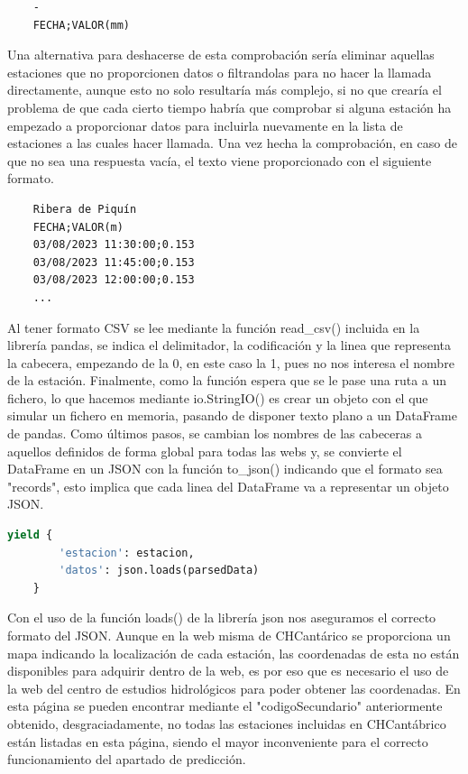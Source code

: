 \begin{verbatim}
	-
	FECHA;VALOR(mm)
\end{verbatim}

Una alternativa para deshacerse de esta comprobación sería eliminar aquellas estaciones que no proporcionen datos o filtrandolas para no hacer la llamada directamente, aunque esto no solo resultaría más complejo, si no que crearía el problema de que cada cierto tiempo habría que comprobar si alguna estación ha empezado a proporcionar datos para incluirla nuevamente en la lista de estaciones a las cuales hacer llamada.\newline
\newline
Una vez hecha la comprobación, en caso de que no sea una respuesta vacía, el texto viene proporcionado con el siguiente formato.

\begin{verbatim}
	Ribera de Piquín
	FECHA;VALOR(m)
	03/08/2023 11:30:00;0.153
	03/08/2023 11:45:00;0.153
	03/08/2023 12:00:00;0.153
	...
\end{verbatim}

Al tener formato CSV se lee mediante la función read\_csv() incluida en la librería pandas, se indica el delimitador, la codificación y la linea que representa la cabecera, empezando de la 0, en este caso la 1, pues no nos interesa el nombre de la estación. Finalmente, como la función espera que se le pase una ruta a un fichero, lo que hacemos mediante io.StringIO() es crear un objeto con el que simular un fichero en memoria, pasando de disponer texto plano a un DataFrame de pandas.\newline
\newline
Como últimos pasos, se cambian los nombres de las cabeceras a aquellos definidos de forma global para todas las webs y, se convierte el DataFrame en un JSON con la función to\_json() indicando que el formato sea "records", esto implica que cada linea del DataFrame va a representar un objeto JSON.

\begin{lstlisting}[language=Python, caption={Guardado de datos de Chcantabrico Nivel Spider}]
	yield {
		'estacion': estacion,
		'datos': json.loads(parsedData)
	}
\end{lstlisting}

Con el uso de la función loads() de la librería json nos aseguramos el correcto formato del JSON.\newline
\newline
Aunque en la web misma de CHCantárico se proporciona un mapa indicando la localización de cada estación, las coordenadas de esta no están disponibles para adquirir dentro de la web, es por eso que es necesario el uso de la web del centro de estudios hidrológicos para poder obtener las coordenadas.\newline
\newline
En esta página se pueden encontrar mediante el "codigoSecundario" anteriormente obtenido, desgraciadamente, no todas las estaciones incluidas en CHCantábrico están listadas en esta página, siendo el mayor inconveniente para el correcto funcionamiento del apartado de predicción.

